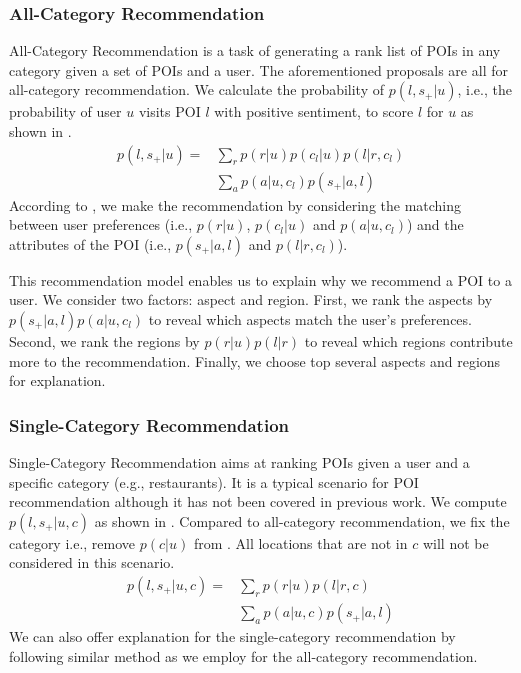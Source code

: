 \subsubsection{All-Category Recommendation}
All-Category Recommendation is a task of
generating a rank list of POIs in any category
given a set of POIs and a user.
The aforementioned proposals are all for all-category recommendation.
We calculate the
probability of $p(l,s_+|u)$, i.e., the probability of user
$u$ visits POI $l$ with positive sentiment, to score $l$ for $u$
as shown in .
\begin{equation}
\begin{split}
p(l,s_+|u)=&\sum_{r}{p(r|u)p(c_l|u)p(l|r,c_l)}\\
&\sum_{a}{p(a|u,c_l)p(s_+|a,l)}
\label{eq:poiacr}
\end{split}
\end{equation}
According to , we make the recommendation
by considering the matching between user preferences (i.e., $p(r|u)$,
$p(c_l|u)$ and $p(a|u,c_l)$) and the attributes of the POI
(i.e., $p(s_+|a,l)$ and $p(l|r,c_l)$).

This recommendation model enables us to explain why we recommend
a POI to a user. We consider two factors: aspect and region.
First, we rank the aspects by $p(s_+|a,l)p(a|u,c_l)$ to reveal
which aspects match the user's preferences.
Second, we rank the regions by $p(r|u)p(l|r)$ to reveal which regions
contribute more to the recommendation. Finally, we choose top several
aspects and regions for explanation.

\subsubsection{Single-Category Recommendation}
Single-Category Recommendation aims at
ranking POIs given a user and
a specific category (e.g., restaurants).
It is a typical scenario for POI recommendation
although it has not been covered in previous work.
We compute $p(l,s_+|u,c)$ as shown in .
Compared to all-category recommendation, we fix the category
i.e., remove $p(c|u)$ from .
All locations that are not in $c$ will not be
considered in this scenario.
\begin{equation}
\begin{split}
p(l,s_+|u,c)=&\sum_{r}{p(r|u)p(l|r,c)}\\
&\sum_{a}{p(a|u,c)p(s_+|a,l)}
\label{eq:poiscr}
\end{split}
\end{equation}
We can also offer explanation for the single-category recommendation
by following similar method as we employ for the all-category recommendation.

